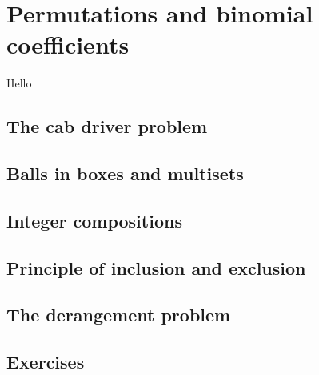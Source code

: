 \section{Permutations and binomial coefficients}\label{permutationsBinomialCoefficient} 

Hello

\subsection{The cab driver problem}

\subsection{Balls in boxes and multisets}

\subsection{Integer compositions}

\subsection{Principle of inclusion and exclusion}

\subsection{The derangement problem}

\subsection{Exercises}